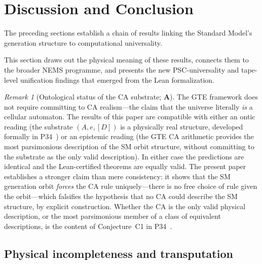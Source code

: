 \documentclass[11pt]{article}
\theoremstyle{remark}
\newtheorem{remark}[theorem]{Remark}
\newcommand{\CatA}{\textbf{A}}
\begin{document}
\section{Discussion and Conclusion}
\label{sec:discussion}

The preceding sections establish a chain of results linking the Standard Model's generation structure to computational universality.

This section draws out the physical meaning of these results, connects them to the broader NEMS programme, and presents the new PSC-universality and tape-level unification findings that emerged from the Lean formalization.

\begin{remark}[Ontological status of the CA substrate; $\CatA$]
\label{rem:ca_ontology}
The GTE framework does not require committing to CA realism---the claim that the
universe literally \emph{is} a cellular automaton.
The results of this paper are compatible with either an ontic reading (the substrate
$(A, e, [D])$ is a physically real structure, developed formally in
P34~\cite{SpivackGTEMobius}) or an epistemic reading (the GTE CA arithmetic provides
the most parsimonious description of the SM orbit structure, without committing to the
substrate as the only valid description).
In either case the predictions are identical and the Lean-certified theorems are equally
valid.
The present paper establishes a stronger claim than mere consistency: it shows that the
SM generation orbit \emph{forces} the CA rule uniquely---there is no free choice of
rule given the orbit---which falsifies the hypothesis that no CA could describe the SM
structure, by explicit construction.
Whether the CA is the only valid physical description, or the most parsimonious member
of a class of equivalent descriptions, is the content of Conjecture~C1 in
P34~\cite{SpivackGTEMobius}.
\end{remark}

\subsection{Physical incompleteness and transputation}
\end{document}
